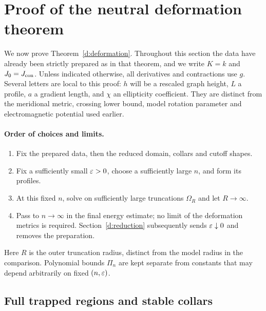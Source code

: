 \section{Proof of the neutral deformation theorem}\label{d:proof}

We now prove Theorem~\ref{d:deformation}.  Throughout this section the
data have already been strictly prepared as in that theorem, and we
write $K=k$ and $J_0=J_{\rm con}$.  Unless indicated otherwise, all
derivatives and contractions use $g$.  Several letters are local to
this proof: $h$ will be a rescaled graph height, $L$ a profile, $a$ a
gradient length, and $\chi$ an ellipticity coefficient.  They are
distinct from the meridional metric, crossing lower bound, model
rotation parameter and electromagnetic potential used earlier.

\paragraph{Order of choices and limits.}
\begin{enumerate}
\item Fix the prepared data, then the reduced domain, collars and cutoff shapes.
\item Fix a sufficiently small $\varepsilon>0$, choose a sufficiently large $n$,
      and form its profiles.
\item At this fixed $n$, solve on sufficiently large truncations $\Omega_R$
      and let $R\to\infty$.
\item Pass to $n\to\infty$ in the final energy estimate; no limit of the
      deformation metrics is required. Section~\ref{d:reduction} subsequently
      sends $\varepsilon\downarrow0$ and removes the preparation.
\end{enumerate}
Here $R$ is the outer truncation radius, distinct from the model radius in
 the comparison. Polynomial bounds $\Pi_n$ are kept separate from constants
 that may depend arbitrarily on fixed $(n,\varepsilon)$.

\subsection{Full trapped regions and stable collars}\label{d:domains}

